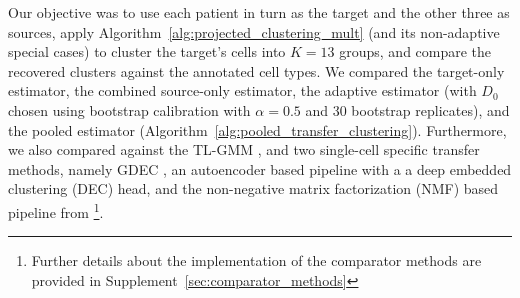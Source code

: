 \documentclass[10pt]{article}
\begin{document}
Our objective was to use each patient in turn as the target and the other three as sources, apply Algorithm~\ref{alg:projected_clustering_mult} (and its non-adaptive special cases) to cluster the target's cells into $K=13$ groups, and compare the recovered clusters against the annotated cell types. 
We compared the target-only estimator, the combined source-only estimator, the adaptive estimator (with $D_0$ chosen using bootstrap calibration with $\alpha=0.5$ and 30 bootstrap replicates), and the pooled estimator (Algorithm~\ref{alg:pooled_transfer_clustering}). Furthermore, we also compared against the TL-GMM \citep{tian2025robust}, and two single-cell specific transfer methods, namely GDEC \citep{gdec_paper}, an autoencoder based pipeline with a a deep embedded clustering (DEC) head, and the non-negative matrix factorization (NMF) based pipeline from \cite{nmf_paper} \footnote{Further details about the implementation of the comparator methods are provided in Supplement~\ref{sec:comparator_methods}}. 
\end{document}
